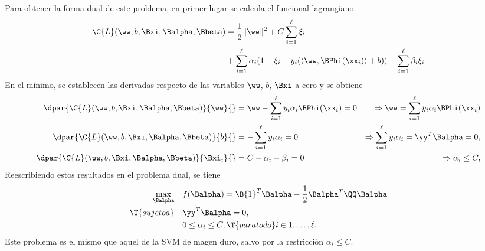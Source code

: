 



Para obtener la forma dual de este problema, en primer lugar se
calcula el funcional lagrangiano
%
\begin{equation}
  \begin{aligned}
  \C{L}(\ww,b,\Bxi,\Balpha,\Bbeta) &= \frac{1}{2} \|\ww\|^2 + C \sum_{i=1}^{\ell} \xi_i \\
  &+ \sum_{i=1}^{\ell} \alpha_i (1-\xi_i-y_i(\langle\ww,\BPhi(\xx_i)\rangle+b)) - \sum_{i=1}^{\ell} \beta_i\xi_i
  \end{aligned}
\end{equation}
%
En el mínimo, se establecen las derivadas respecto de las variables
$\ww$, $b$, $\Bxi$ a cero y se obtiene
%
\begin{align}
  \dpar{ \C{L}(\ww,b,\Bxi,\Balpha,\Bbeta)}{\ww}{}
    &=\ww-\sum_{i=1}^\ell y_i\alpha_i\BPhi(\xx_i) = 0
    &\Rightarrow \ww = \sum_{i=1}^\ell y_i\alpha_i\BPhi(\xx_i)
  \\
  \dpar{ \C{L}(\ww,b,\Bxi,\Balpha,\Bbeta)}{b}{}
    &=-\sum_{i=1}^\ell y_i\alpha_i = 0
    &\Rightarrow \sum_{i=1}^\ell y_i\alpha_i = \yy^T\Balpha = 0,\\
  \dpar{ \C{L}(\ww,b,\Bxi,\Balpha,\Bbeta)}{\Bxi_i}{}
    &=C-\alpha_i-\beta_i = 0
    &\Rightarrow \alpha_i \leq C,
\end{align}
%
Reescribiendo estos resultados en el problema dual, se tiene
%
\begin{equation}
\begin{aligned}\label{svmprob-dual-soft}
    \max_{\Balpha} \quad
    & f(\Balpha) = \B{1}^T\Balpha-\frac{1}{2}\Balpha^T\QQ\Balpha\\
    \T{sujeto a}\quad & \yy^T\Balpha = 0, \\
                      & 0\leq\alpha_i\leq C, \T{ para todo } i\in {1,\ldots,\ell }.
\end{aligned}\end{equation}
%
Este problema es el mismo que aquel de la SVM de magen duro, salvo por
la restricción $\alpha_i\leq C$.

